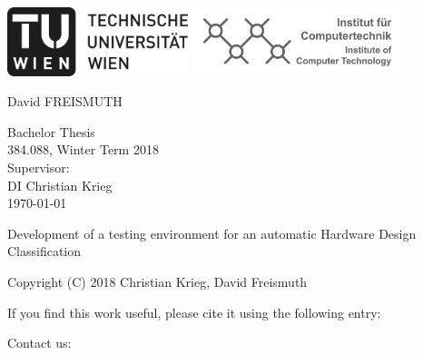\documentclass[%
	a4paper,
]
{article}
\begin{document}
%
\begin{titlepage}

	\begin{center}

	\includegraphics[height=2cm]{fig/logo-tu-bw.png}%
	\hfill{}%
	\includegraphics[height=2cm]{fig/logo-ict.png}%
	

	\vspace{5em}


		\large
		David FREISMUTH\\
	

	\vspace{5em}

		{\huge Bachelor Thesis}\\[1em]
		{\Large 384.088, Winter Term 2018} \\[2em]
		{\large Supervisor:\\[.5em]
			DI Christian Krieg} \\[5em]

		\today
		\vspace{5em}

		{\Huge Development of a testing environment for an automatic Hardware Design Classification }\\[2em]

		\vspace{3em}
	\end{center}

\end{titlepage}
%
%

Copyright (C) 2018 Christian Krieg, David Freismuth

If you find this work useful, please cite it using the following \BibTeX{ } entry:

\vspace{1em}


\vspace{3em}
Contact us:
\end{document}
